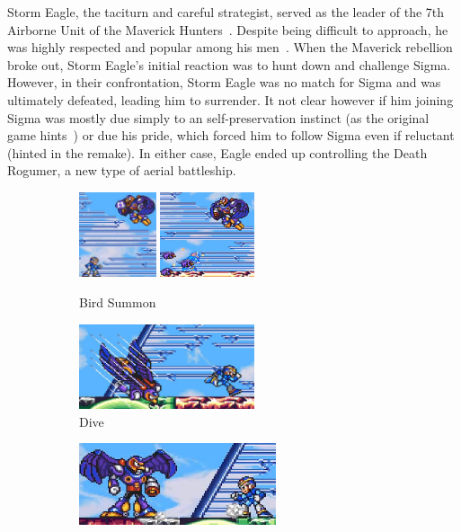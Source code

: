 Storm Eagle, the taciturn and careful strategist, served as the leader of the 7th Airborne Unit of the Maverick Hunters~\cite{wiki:Storm_eagle}. Despite being difficult to approach, he was highly respected and popular among his men~\cite{MHX:manual}. When the Maverick rebellion broke out, Storm Eagle's initial reaction was to hunt down and challenge Sigma. However, in their confrontation, Storm Eagle was no match for Sigma and was ultimately defeated, leading him to surrender. It not clear however if him joining Sigma was mostly due simply to an self-preservation instinct (as the original game  hints~\cite{Xcoll1:Manual_X1}) or due his pride, which forced him to follow Sigma even if reluctant (hinted in the remake). In either case, Eagle ended up controlling the Death Rogumer, a new type of aerial battleship.
\begin{figure}[htp]
	\centering
	\begin{subfigure}{.49\linewidth}
		\centering
		\includegraphics[height=2.5cm]{figures/X1/Storm_eagle/Eagle_egg_1.jpg}
		\includegraphics[height=2.5cm]{figures/X1/Storm_eagle/Eagle_egg_2.jpg}
		\caption{Bird Summon}
	\end{subfigure}
	\begin{subfigure}{.49\linewidth}
		\centering
		\includegraphics[height=2.5cm]{figures/X1/Storm_eagle/Eagle_dive.jpg}
		\caption{Dive}
	\end{subfigure}
	\begin{subfigure}{.49\linewidth}
		\centering
		\includegraphics[height=2.4cm]{figures/X1/Storm_eagle/Eagle_push.jpg}

\end{subfigure}
\end{figure}
